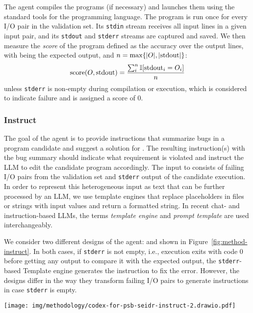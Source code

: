 The \execute{} agent compiles the programs (if necessary) and launches them using the standard tools for the programming language.
The program is run once for every I/O pair in the validation set. 
Its \texttt{stdin} stream receives all input lines in a given input pair, and its \texttt{stdout} and \texttt{stderr} streams are captured and saved.
We then measure the \emph{score} of the program defined as the accuracy over the output lines, with \expectedoutput{} being the expected output, and $n=\max\{|O{}|, |\text{stdout}|\}$:
\[    
\text{score}(O{}, \text{stdout}) = \frac{\sum^{n}_i{\mathbb{I}[\text{stdout}_i = O_i]}}{n} 
\]
unless \texttt{stderr} is non-empty during compilation or execution, which is considered to indicate failure and is assigned a score of 0.

\subsubsection{Instruct}
\label{sec:seidr-instruct}

The goal of the \instruct{} agent is to provide instructions that summarize bugs in a program candidate and suggest a solution for \debugmodelnoargs{}. 
The resulting instruction(s) with the bug summary should indicate what requirement is violated and instruct the LLM to edit the candidate program accordingly. 
The input to \instruct{} consists of failing I/O pairs from the validation set and \texttt{stderr} output of the candidate execution. 
In order to represent this heterogeneous input as text that can be further processed by an LLM, we use template engines that replace placeholders in files or strings with input values and return a formatted string. 
In recent chat- and instruction-based LLMs, the terms \emph{template engine} and \emph{prompt template} are used interchangeably.

We consider two different designs of the \instruct{} agent: \instructs{} and \instructllm{} shown in Figure~\ref{fig:method-instruct}. 
In both cases, if \texttt{stderr} is not empty, i.e., execution exits with code 0 before getting any output to compare it with the expected output, the \texttt{stderr}-based Template engine generates the instruction to fix the error. 
However, the designs differ in the way they transform failing I/O pairs to generate instructions in case \texttt{stderr} is empty.

\begin{figure*}[t]
    \centering
    \texttt{[image: img/methodology/codex-for-psb-seidr-instruct-2.drawio.pdf]}
    \caption{Overview of the two designs for the \instruct{} agent.}
    \label{fig:method-instruct}
\end{figure*}

